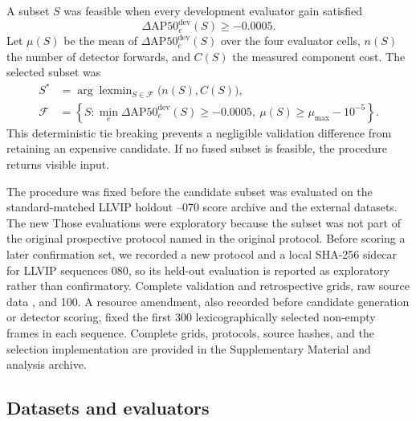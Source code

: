 \documentclass[preprint,11pt]{elsarticle}
\providecommand{\DIFaddtex}[1]{{\protect\color{blue} \sf #1}} %
\providecommand{\DIFdeltex}[1]{{\protect\color{red} \scriptsize #1}} %
\providecommand{\DIFaddbegin}{} %
\providecommand{\DIFaddend}{} %
\providecommand{\DIFdelbegin}{} %
\providecommand{\DIFdelend}{} %
\providecommand{\DIFadd}[1]{\texorpdfstring{\DIFaddtex{#1}}{#1}} %
\providecommand{\DIFdel}[1]{\texorpdfstring{\DIFdeltex{#1}}{}} %
\begin{document}
A subset \(S\) was feasible when every development evaluator gain satisfied
\begin{equation}
\Delta \mathrm{AP50}^{\mathrm{dev}}_e(S) \ge -0.0005.
\end{equation}
Let \(\mu(S)\) be the mean of
\(\Delta \mathrm{AP50}^{\mathrm{dev}}_e(S)\) over the four evaluator cells,
\(n(S)\) the number of detector forwards, and \(C(S)\) the measured component
cost. The selected subset was
\begin{equation}
\begin{aligned}
S^\ast&=\arg\operatorname{lexmin}_{S\in\mathcal{F}}
\bigl(n(S),C(S)\bigr),\\
\mathcal{F}&=\left\{S:
\min_e\Delta \mathrm{AP50}^{\mathrm{dev}}_e(S)\ge-0.0005,
\ \mu(S)\ge\mu_{\max}-10^{-5}
\right\}.
\end{aligned}
\end{equation}
This deterministic tie breaking prevents a negligible validation difference
from retaining an expensive candidate. If no fused subset is feasible, the
procedure returns visible input.

The procedure was fixed before the candidate subset was evaluated on the
standard-matched LLVIP \DIFdelbegin \DIFdel{holdout }\DIFdelend \DIFaddbegin \DIFadd{050--070 score archive }\DIFaddend and the external datasets. \DIFdelbegin \DIFdel{The new }\DIFdelend \DIFaddbegin \DIFadd{Those
evaluations were exploratory because the }\DIFaddend subset was not \DIFdelbegin \DIFdel{part of the original
prospective protocol}\DIFdelend \DIFaddbegin \DIFadd{named in the original
protocol. Before scoring a later confirmation set, we recorded a new protocol
and a local SHA-256 sidecar for LLVIP sequences 080}\DIFaddend , \DIFdelbegin \DIFdel{so its held-out evaluation is
reported as exploratory rather than confirmatory. Complete validation and
retrospective grids, raw source data}\DIFdelend \DIFaddbegin \DIFadd{090, and 100. A resource
amendment, also recorded before candidate generation or detector scoring,
fixed the first 300 lexicographically selected non-empty frames in each
sequence. Complete grids}\DIFaddend , \DIFaddbegin \DIFadd{protocols, source hashes, }\DIFaddend and the selection
implementation are provided in the Supplementary Material and analysis
archive.

\subsection{Datasets and evaluators}
\end{document}
